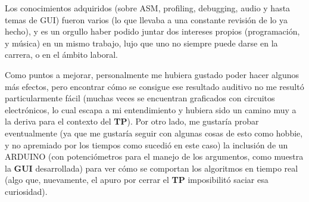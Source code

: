 Los conocimientos adquiridos (sobre ASM, profiling, debugging, audio y hasta temas de GUI) fueron varios (lo que llevaba a una constante revisión de lo ya hecho), y es un orgullo haber podido juntar dos intereses propios (programación, y música) en un mismo trabajo, lujo que uno no siempre puede darse en la carrera, o en el ámbito laboral.\vspace{\baselineskip}

Como puntos a mejorar, personalmente me hubiera gustado poder hacer algunos más efectos, pero encontrar cómo se consigue ese resultado auditivo no me resultó particularmente fácil (muchas veces se encuentran graficados con circuitos electrónicos, lo cual escapa a mi entendimiento y hubiera sido un camino muy a la deriva para el contexto del \textbf{TP}). Por otro lado, me gustaría probar eventualmente (ya que me gustaría seguir con algunas cosas de esto como hobbie, y no apremiado por los tiempos como sucedió en este caso) la inclusión de un ARDUINO (con potenciómetros para el manejo de los argumentos, como muestra la \textbf{GUI} desarrollada) para ver cómo se comportan los algoritmos en tiempo real (algo que, nuevamente, el apuro por cerrar el \textbf{TP} imposibilitó saciar esa curiosidad). 